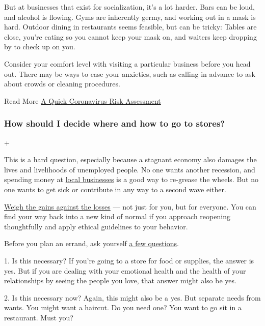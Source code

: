 But at businesses that exist for socialization, it's a lot harder. Bars
can be loud, and alcohol is flowing. Gyms are inherently germy, and
working out in a mask is hard. Outdoor dining in restaurants seems
feasible, but can be tricky: Tables are close, you're eating so you
cannot keep your mask on, and waiters keep dropping by to check up on
you.

Consider your comfort level with visiting a particular business before
you head out. There may be ways to ease your anxieties, such as calling
in advance to ask about crowds or cleaning procedures.

Read More
\href{https://www.nytimes3xbfgragh.onion/interactive/2020/06/03/burst/coronavirus-risk-gym-surfaces-bike.html}{A
Quick Coronavirus Risk Assessment}

\hypertarget{how-should-i-decide-where-and-how-to-go-to-stores}{%
\subsubsection{How should I decide where and how to go to
stores?}\label{how-should-i-decide-where-and-how-to-go-to-stores}}

+

This is a hard question, especially because a stagnant economy also
damages the lives and livelihoods of unemployed people. No one wants
another recession, and spending money at
\href{https://www.nytimes3xbfgragh.onion/2020/06/18/business/small-business-reopening-coronavirus.html}{local
businesses} is a good way to re-grease the wheels. But no one wants to
get sick or contribute in any way to a second wave either.

\href{https://www.nytimes3xbfgragh.onion/2020/04/08/dining/takeout-restaurant-ethics-coronavirus.html}{Weigh
the gains against the losses} --- not just for you, but for everyone.
You can find your way back into a new kind of normal if you approach
reopening thoughtfully and apply ethical guidelines to your behavior.

Before you plan an errand, ask yourself
\href{https://www.nytimes3xbfgragh.onion/interactive/2020/05/06/opinion/coronavirus-us-reopen.html}{a
few questions}.

1. Is this necessary? If you're going to a store for food or supplies,
the answer is yes. But if you are dealing with your emotional health and
the health of your relationships by seeing the people you love, that
answer might also be yes.

2. Is this necessary now? Again, this might also be a yes. But separate
needs from wants. You might want a haircut. Do you need one? You want to
go sit in a restaurant. Must you?

